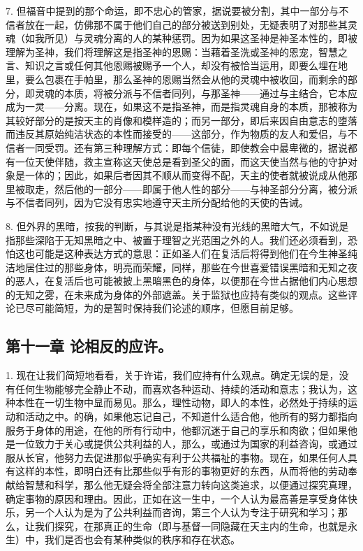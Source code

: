 7. 但福音中提到的那个命运，即不忠心的管家，据说要被分割，其中一部分与不信者放在一起，仿佛那不属于他们自己的部分被送到别处，无疑表明了对那些其灵魂（如我所见）与灵魂分离的人的某种惩罚。因为如果这圣神是神圣本性的，即被理解为圣神，我们将理解这是指圣神的恩赐：当藉着圣洗或圣神的恩宠，智慧之言、知识之言或任何其他恩赐被赐予一个人，却没有被恰当运用，即要么埋在地里，要么包裹在手帕里，那么圣神的恩赐当然会从他的灵魂中被收回，而剩余的部分，即灵魂的本质，将被分派与不信者同列，与那圣神——通过与主结合，它本应成为一灵——分离。现在，如果这不是指圣神，而是指灵魂自身的本质，那被称为其较好部分的是按天主的肖像和模样造的；而另一部分，即后来因自由意志的堕落而违反其原始纯洁状态的本性而接受的——这部分，作为物质的友人和爱侣，与不信者一同受罚。还有第三种理解方式：即每个信徒，即使教会中最卑微的，据说都有一位天使伴随，救主宣称这天使总是看到圣父的面，而这天使当然与他的守护对象是一体的；因此，如果后者因其不顺从而变得不配，天主的使者就被说成从他那里被取走，然后他的一部分——即属于他人性的部分——与神圣部分分离，被分派与不信者同列，因为它没有忠实地遵守天主所分配给他的天使的告诫。\par

8. 但外界的黑暗，按我的判断，与其说是指某种没有光线的黑暗大气，不如说是指那些深陷于无知黑暗之中、被置于理智之光范围之外的人。我们还必须看到，恐怕这也可能是这种表达方式的意思：正如圣人们在复活后将得到他们在今生神圣纯洁地居住过的那些身体，明亮而荣耀，同样，那些在今世喜爱错误黑暗和无知之夜的恶人，在复活后也可能被披上黑暗黑色的身体，以便那在今世占据他们内心思想的无知之雾，在未来成为身体的外部遮盖。关于监狱也应持有类似的观点。这些评论已尽可能简短，为的是暂时保持我们论述的顺序，但愿目前足够。\par


\subsection{第十一章 论相反的应许。}

1. 现在让我们简短地看看，关于许诺，我们应持有什么观点。确定无误的是，没有任何生物能够完全静止不动，而喜欢各种运动、持续的活动和意志；我认为，这种本性在一切生物中显而易见。那么，理性动物，即人的本性，必然处于持续的运动和活动之中。的确，如果他忘记自己，不知道什么适合他，他所有的努力都指向服务于身体的用途，在他的所有行动中，他都沉迷于自己的享乐和肉欲；但如果他是一位致力于关心或提供公共利益的人，那么，或通过为国家的利益咨询，或通过服从长官，他努力去促进那似乎确实有利于公共福祉的事物。现在，如果任何人具有这样的本性，即明白还有比那些似乎有形的事物更好的东西，从而将他的劳动奉献给智慧和科学，那么他无疑会将全部注意力转向这类追求，以便通过探究真理，确定事物的原因和理由。因此，正如在这一生中，一个人认为最高善是享受身体快乐，另一个人认为是为了公共利益而咨询，第三个人认为专注于研究和学习；那么，让我们探究，在那真正的生命（即与基督一同隐藏在天主内的生命，也就是永生）中，我们是否也会有某种类似的秩序和存在状态。\par

